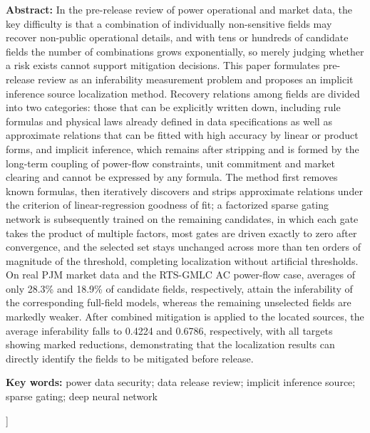 \documentclass[UTF8,zihao=5,twoside]{ctexart}
\begin{document}
\noindent\textbf{Abstract:} In the pre-release review of power operational and market data, the key difficulty is that a combination of individually non-sensitive fields may recover non-public operational details, and with tens or hundreds of candidate fields the number of combinations grows exponentially, so merely judging whether a risk exists cannot support mitigation decisions. This paper formulates pre-release review as an inferability measurement problem and proposes an implicit inference source localization method. Recovery relations among fields are divided into two categories: those that can be explicitly written down, including rule formulas and physical laws already defined in data specifications as well as approximate relations that can be fitted with high accuracy by linear or product forms, and implicit inference, which remains after stripping and is formed by the long-term coupling of power-flow constraints, unit commitment and market clearing and cannot be expressed by any formula. The method first removes known formulas, then iteratively discovers and strips approximate relations under the criterion of linear-regression goodness of fit; a factorized sparse gating network is subsequently trained on the remaining candidates, in which each gate takes the product of multiple factors, most gates are driven exactly to zero after convergence, and the selected set stays unchanged across more than ten orders of magnitude of the threshold, completing localization without artificial thresholds. On real PJM market data and the RTS-GMLC AC power-flow case, averages of only 28.3\% and 18.9\% of candidate fields, respectively, attain the inferability of the corresponding full-field models, whereas the remaining unselected fields are markedly weaker. After combined mitigation is applied to the located sources, the average inferability falls to 0.4224 and 0.6786, respectively, with all targets showing marked reductions, demonstrating that the localization results can directly identify the fields to be mitigated before release.\par
\noindent\textbf{Key words:} power data security; data release review; implicit inference source; sparse gating; deep neural network\par\vspace{0.8em}

\vspace{0.8em}
]
\end{document}
